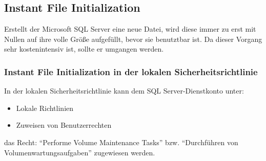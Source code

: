       \subsection{Instant File Initialization}
        Erstellt der Microsoft SQL Server eine neue Datei, wird diese immer zu
        erst mit Nullen auf ihre volle Größe aufgefüllt, bevor sie benutztbar ist.
        Da dieser Vorgang sehr kostenintensiv ist, sollte er umgangen werden.
        \subsubsection{Instant File Initialization in der lokalen
        Sicherheitsrichtlinie}
        In der lokalen Sicherheitsrichtlinie kann dem SQL Server-Dienstkonto
        unter:
        \begin{itemize}
            \item Lokale Richtlinien
            \item Zuweisen von Benutzerrechten
        \end{itemize}
        das Recht: \enquote{Performe Volume Maintenance Tasks} bzw.
        \enquote{Durchführen von Volumenwartungsaufgaben} zugewiesen werden.
